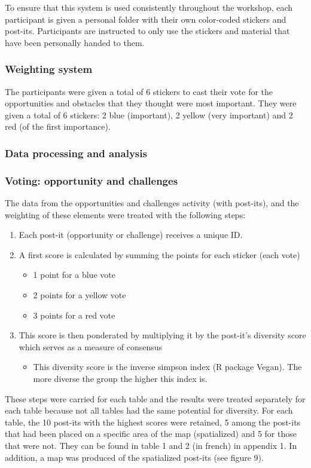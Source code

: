 To ensure that this system is used consistently throughout the workshop, each participant is given a personal folder with their own color-coded stickers and post-its. Participants are instructed to only use the stickers and material that have been personally handed to them.\\

\subsubsection{Weighting system}

 The participants were given a total of 6 stickers to cast their vote for the opportunities and obstacles that they thought were most important. They were given a total of 6 stickers: 2 blue (important), 2 yellow (very important) and 2 red (of the first importance).\\

\subsubsection{Data processing and analysis}

\subsubsection*{Voting: opportunity and challenges}

The data from the opportunities and challenges activity (with post-its), and the weighting of these elements were treated with the following steps:
\begin{enumerate}
  \item Each post-it (opportunity or challenge) receives a unique ID.
  \item A first score is calculated by summing the points for each sticker (each vote)
  \begin{itemize}
      \item 1 point for a blue vote
      \item 2 points for a yellow vote
      \item 3 points for a red vote
  \end{itemize}
  \item This score is then ponderated by multiplying it by the post-it’s diversity score which serves as a measure of consensus
\begin{itemize}
\item This diversity score is the inverse simpson index (R package Vegan). The more diverse the group the higher this index is.
\end{itemize}
\end{enumerate}
These steps were carried for each table and the results were treated separately for each table because not all tables had the same potential for diversity. For each table, the 10 post-its with the highest scores were retained, 5 among the post-its that had been placed on a specific area of the map (spatialized) and 5 for those that were not. They can be found in table 1 and 2 (in french) in appendix 1. In addition, a map was produced of the spatialized post-its (see figure 9).\\

